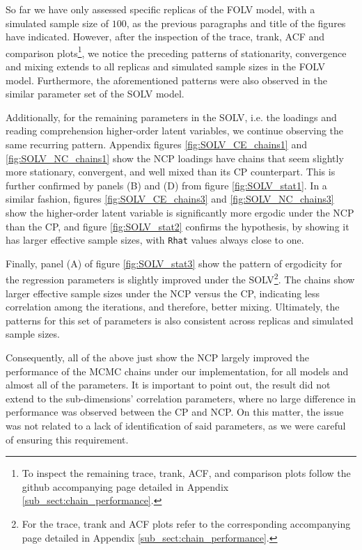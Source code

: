 So far we have only assessed specific replicas of the FOLV model, with a simulated sample size of $100$, as the previous paragraphs and title of the figures have indicated. However, after the inspection of the trace, trank, ACF and comparison plots\footnote{To inspect the remaining trace, trank, ACF, and comparison plots follow the github accompanying page detailed in Appendix \ref{sub_sect:chain_performance}.}, we notice the preceding patterns of stationarity, convergence and mixing extends to all replicas and simulated sample sizes in the FOLV model. Furthermore, the aforementioned patterns were also observed in the similar parameter set of the SOLV model. 

Additionally, for the remaining parameters in the SOLV, i.e. the loadings and reading comprehension higher-order latent variables, we continue observing the same recurring pattern. Appendix figures \ref{fig:SOLV_CE_chains1} and \ref{fig:SOLV_NC_chains1} show the NCP loadings have chains that seem slightly more stationary, convergent, and well mixed than its CP counterpart. This is further confirmed by panels (B) and (D) from figure \ref{fig:SOLV_stat1}. In a similar fashion, figures \ref{fig:SOLV_CE_chains3} and \ref{fig:SOLV_NC_chains3} show the higher-order latent variable is significantly more ergodic under the NCP than the CP, and figure \ref{fig:SOLV_stat2} confirms the hypothesis, by showing it has larger effective sample sizes, with \texttt{Rhat} values always close to one.

Finally, panel (A) of figure \ref{fig:SOLV_stat3} show the pattern of ergodicity for the regression parameters is slightly improved under the SOLV\footnote{For the trace, trank and ACF plots refer to the corresponding accompanying page detailed in Appendix \ref{sub_sect:chain_performance}.}. The chains show larger effective sample sizes under the NCP versus the CP, indicating less correlation among the iterations, and therefore, better mixing. Ultimately, the patterns for this set of parameters is also consistent across replicas and simulated sample sizes.

\begin{comment}
The result appear to be sensible because of two factors, (i) as not only the different sub-dimensions are , but also beacuse the SOLV model was the data generating model.
\end{comment}

Consequently, all of the above just show the NCP largely improved the performance of the MCMC chains under our implementation, for all models and almost all of the parameters. It is important to point out, the result did not extend to the sub-dimensions' correlation parameters, where no large difference in performance was observed between the CP and NCP. On this matter, the issue was not related to a lack of identification of said parameters, as we were careful of ensuring this requirement.

